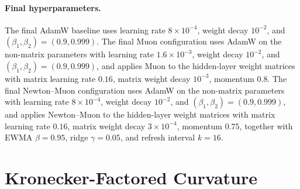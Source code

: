 \documentclass[11pt]{article}
\begin{document}
\paragraph{Final hyperparameters.}
The final AdamW baseline uses learning rate $8\times 10^{-4}$, weight decay $10^{-2}$, and $(\beta_1,\beta_2)=(0.9,0.999)$. The final Muon configuration uses AdamW on the non-matrix parameters with learning rate $1.6\times 10^{-3}$, weight decay $10^{-2}$, and $(\beta_1,\beta_2)=(0.9,0.999)$, and applies Muon to the hidden-layer weight matrices with matrix learning rate $0.16$, matrix weight decay $10^{-3}$, momentum $0.8$. The final Newton--Muon configuration uses AdamW on the non-matrix parameters with learning rate $8\times 10^{-4}$, weight decay $10^{-2}$, and $(\beta_1,\beta_2)=(0.9,0.999)$, and applies Newton--Muon to the hidden-layer weight matrices with matrix learning rate $0.16$, matrix weight decay $3\times 10^{-4}$, momentum $0.75$, together with EWMA $\beta=0.95$, ridge $\gamma=0.05$, and refresh interval $k=16$.


\section{Kronecker-Factored Curvature}
\label{app:kronecker-factor}
\end{document}
